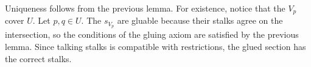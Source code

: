 Uniqueness follows from the previous lemma. For existence, notice that the
$V_p$ cover $U$. Let $p, q \in U$. The $s_{V_p}$ are gluable because their stalks
agree on the intersection, so the conditions of the gluing axiom are satisfied
by the previous lemma. Since talking stalks is compatible with restrictions, the
glued section has the correct stalks.
